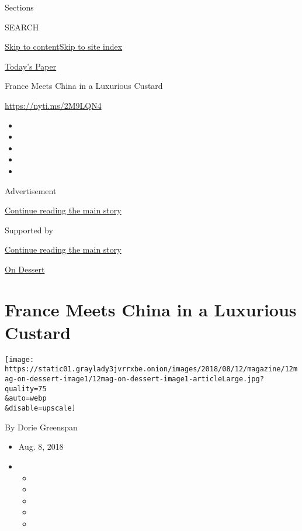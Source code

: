 Sections

SEARCH

\protect\hyperlink{site-content}{Skip to
content}\protect\hyperlink{site-index}{Skip to site index}

\href{https://myaccount.nytimes3xbfgragh.onion/auth/login?response_type=cookie\&client_id=vi}{}

\href{https://www.nytimes3xbfgragh.onion/section/todayspaper}{Today's
Paper}

France Meets China in a Luxurious Custard

\url{https://nyti.ms/2M9LQN4}

\begin{itemize}
\item
\item
\item
\item
\item
\end{itemize}

Advertisement

\protect\hyperlink{after-top}{Continue reading the main story}

Supported by

\protect\hyperlink{after-sponsor}{Continue reading the main story}

\href{/column/on-dessert}{On Dessert}

\hypertarget{france-meets-china-in-a-luxurious-custard}{%
\section{France Meets China in a Luxurious
Custard}\label{france-meets-china-in-a-luxurious-custard}}

\texttt{[image: https://static01.graylady3jvrrxbe.onion/images/2018/08/12/magazine/12mag-on-dessert-image1/12mag-on-dessert-image1-articleLarge.jpg?quality=75\\\&auto=webp\\\&disable=upscale]}

By Dorie Greenspan

\begin{itemize}
\item
  Aug. 8, 2018
\item
  \begin{itemize}
  \item
  \item
  \item
  \item
  \item
  \end{itemize}
\end{itemize}

